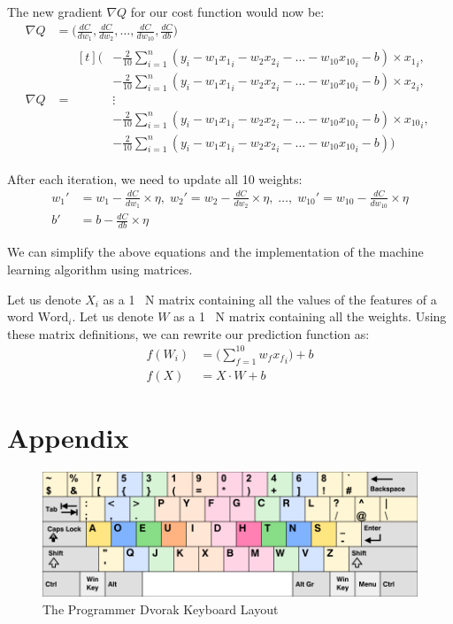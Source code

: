 \documentclass[12pt, demo]{article}
\begin{document}
The new gradient $\nabla Q$ for our cost function would now be:
\begin{align*}
	\nabla Q & = \Big(\frac{dC}{dw_1}, \frac{dC}{dw_2}, \dots, \frac{dC}{dw_{10}}, \frac{dC}{db}\Big)
	\\
	\nabla Q & =
	\begin{aligned}[t]
		\Big(
		 & -\frac{2}{10} \sum_{i=1}^{n} (y_i - w_1{x_1}_i - w_2{x_2}_i - \dots - w_{10}{x_{10}}_i - b) \times {x_1}_i,
		\\
		 & -\frac{2}{10} \sum_{i=1}^{n} (y_i - w_1{x_1}_i - w_2{x_2}_i - \dots - w_{10}{x_{10}}_i - b) \times {x_2}_i,
		\\
		& \vdots
		\\
		 & -\frac{2}{10} \sum_{i=1}^{n} (y_i - w_1{x_1}_i - w_2{x_2}_i - \dots - w_{10}{x_{10}}_i - b) \times {x_{10}}_i,
		\\
		 & -\frac{2}{10} \sum_{i=1}^{n} (y_i - w_1{x_1}_i - w_2{x_2}_i - \dots - w_{10}{x_{10}}_i - b)
		\Big)
	\end{aligned}
\end{align*}

After each iteration, we need to update all 10 weights:
\begin{align*}
	w_1' & = w_1 - \frac{dC}{dw_1} \times \eta,
	\;
	w_2' = w_2 - \frac{dC}{dw_2} \times \eta,
	\;
	\dots,
	\;
	w_{10}' = w_{10} - \frac{dC}{dw_{10}} \times \eta
	\\
	b' & = b - \frac{dC}{db} \times \eta
\end{align*}

We can simplify the above equations and the implementation of the machine learning algorithm using matrices.

Let us denote $X_i$ as a 1 \times~N matrix containing all the values of the features of a word $\text{Word}_i$. Let us denote $W$ as a 1 \times~N matrix containing all the weights. Using these matrix definitions, we can rewrite our prediction function as:
\begin{align*}
f(W_i) & = \Big(\sum_{f=1}^{10} w_f{x_f}_i\Big) + b
\\
f(X) & = X \cdot W + b
\end{align*}


\section*{Appendix}

\begin{figure}[H]
	\caption{The Programmer Dvorak Keyboard Layout}
	\includegraphics[width=\textwidth]{programmer-dvorak.png}
\end{figure}
\end{document}
